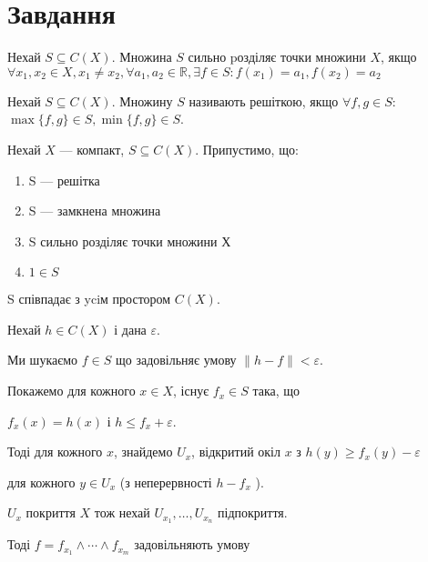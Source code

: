
\chapter{Завдання \theHchapter}

\begin{tcolorbox}[title=Означення 1]
    Нехай $S \subseteq C(X)$. 
    Множина $S$ сильно pозділяє точки множини $X$, якщо
    $\forall x_1, x_2 \in X, x_1 \neq x_2, \forall a_1, a_2 \in \mathbb{R},
    \exists f \in S: f(x_1) = a_1, f(x_2) = a_2$
\end{tcolorbox}

\begin{tcolorbox}[title=Означення 2]
    Нехай $S \subseteq C(X)$. Множину $S$ називають решіткою, 
    якщо $\forall f, g \in S$:
    $\max\{f,g\} \in S, \min\{f,g\} \in S$.
\end{tcolorbox}


\begin{tcolorbox}[title=теорема Какутанi–Крейна.]
    Нехай $X$ — компакт, $S \subseteq C(X)$. Припустимо, що:

    \begin{enumerate}[1)]
        \item S — решітка
        \item S — замкнена множина 
        \item S сильно розділяє точки множини Х
        \item $1 \in S$
    \end{enumerate}

    
    S співпадає з yciм простором $C(X)$.
\end{tcolorbox}



\pagebreak

Нехай $h \in C(X)$ і дана $\varepsilon$. 


Ми шукаємо $f \in S$ що задовільняє умову 
$\|h-f\|<\varepsilon$.


Покажемо для кожного $x \in X$, існує 
$f_x \in S$ така, що 


$f_x(x)=h(x)$ і $h \leq f_x+\varepsilon$.


Тоді для кожного $x$, знайдемо $U_x$, відкритий окіл $x$ з 
$h(y) \geq f_x(y)-\varepsilon$ 


для кожного $y \in U_x$ (з неперервності $h-f_x$ ). 


$U_x$ покриття $X$ тож нехай $U_{x_1}, \ldots, U_{x_n}$ підпокриття. 


Тоді $f=f_{x_1} \wedge \cdots \wedge f_{x_m}$ задовільняють умову


